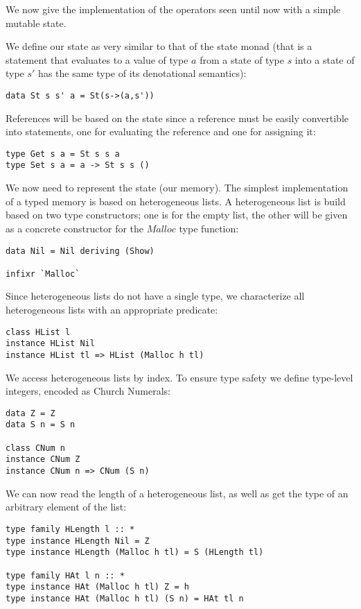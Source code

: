We now give the implementation of the operators seen until now with a simple mutable state.

We define our state as very similar to that of the state monad (that is a statement that evaluates to a value of type $a$ from a state of type $s$ into a state of type $s'$ has the same type of its denotational semantics):
\begin{lstlisting}
data St s s' a = St(s->(a,s'))
\end{lstlisting}

References will be based on the state since a reference must be easily convertible into statements, one for evaluating the reference and one for assigning it:
\begin{lstlisting}
type Get s a = St s s a
type Set s a = a -> St s s ()
\end{lstlisting}

We now need to represent the state (our memory). The simplest implementation of a typed memory is based on heterogeneous lists. A heterogeneous list is build based on two type constructors; one is for the empty list, the other will be given as a concrete constructor for the $Malloc$ type function:
\begin{lstlisting}
data Nil = Nil deriving (Show)

infixr `Malloc`
\end{lstlisting}

Since heterogeneous lists do not have a single type, we characterize all heterogeneous lists with an appropriate predicate:
\begin{lstlisting}
class HList l
instance HList Nil
instance HList tl => HList (Malloc h tl)
\end{lstlisting}

We access heterogeneous lists by index. To ensure type safety we define type-level integers, encoded as Church Numerals:
\begin{lstlisting}
data Z = Z
data S n = S n

class CNum n
instance CNum Z
instance CNum n => CNum (S n)
\end{lstlisting}

We can now read the length of a heterogeneous list, as well as get the type of an arbitrary element of the list:

\begin{lstlisting}
type family HLength l :: *
type instance HLength Nil = Z
type instance HLength (Malloc h tl) = S (HLength tl)

type family HAt l n :: *
type instance HAt (Malloc h tl) Z = h
type instance HAt (Malloc h tl) (S n) = HAt tl n
\end{lstlisting}

